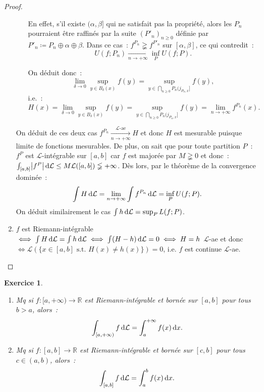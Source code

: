 \documentclass{article}
\newtheorem{ex}{Exercice}[section]
\newcommand{\pinfty}{{+\infty}}
\newcommand{\st}{\text{ s.t. }}
\newcommand{\R}{{\mathbb R}}
\begin{document}
\begin{proof}
\begin{enumerate}
\begin{itemize}
		En effet, s'il existe $(\alpha, \beta]$ qui ne satisfait pas la propriété, alors les $P_n$ pourraient être raffinés par la suite $(P'_n)_{n \geq 0}$ définie par
		$P'_n \coloneqq P_n \oplus \alpha \oplus \beta$. Dans ce cas~: $f^{P_n} \gneqq f^{P'_n}$ sur $[\alpha, \beta]$, ce qui contredit~:
		\[U(f; P_n) \xrightarrow[n \to \pinfty]{} \inf_PU(f; P).\]

		On déduit donc~:
		\[\lim_{\delta \to 0}\sup_{y \in B_\delta(x)}f(y) = \sup_{y \in \bigcap_{n \geq 0}P_n(j_{P_n,x}]}f(y),\]
		i.e.~:
		\[H(x) = \lim_{\delta \to 0}\sup_{y \in B_\delta(x)}f(y) = \sup_{y \in \bigcap_{n \geq 0}P_n(j_{P_n,x}]}f(y) = \lim_{n \to \pinfty}f^{P_n}(x).\]
	\end{itemize}
	On déduit de ces deux cas $f^{P_n} \xrightarrow[n \to \pinfty]{\mathcal L\text{-ae}} H$ et donc $H$ est mesurable puisque limite de fonctions mesurables. De plus, on sait
	que pour toute partition $P$~: $f^P$ est $\mathcal L$-intégrable sur $[a, b]$ car $f$ est majorée par $M \gneqq 0$ et donc~:
	$\int_{[a, b]} \abs {f^P}\dif\mathcal L \leq M\mathcal L([a, b]) \lneqq \pinfty$. Dès lors,
	par le théorème de la convergence dominée~:
	\[\int H\dif\mathcal L = \lim_{n \to \pinfty}\int f^{P_n}\dif\mathcal L = \inf_PU(f; P).\]
	On déduit similairement le cas $\int h\dif\mathcal L = \sup_PL(f; P)$.

	\item $f$ est Riemann-intégrable $\iff \int H\dif\mathcal L = \int h\dif\mathcal L \iff \int (H-h)\dif\mathcal L = 0 \iff H = h$ $\mathcal L$-ae
	et donc $\iff \mathcal L(\{x \in [a, b] \st H(x) \neq h(x)\}) = 0$, i.e. $f$ est continue $\mathcal L$-ae.
\end{enumerate}
\end{proof}

\begin{ex}~
\begin{enumerate}
	\item Mq si $f : [a, \pinfty) \to \R$ est Riemann-intégrable et bornée sur $[a, b]$ pour tous $b > a$, alors~:
	\[\int_{[a, \pinfty)}f\dif\mathcal L = \int_a^\pinfty f(x)\dif x.\]
	\item Mq si $f : [a, b] \to \R$ est Riemann-intégrable et bornée sur $[c, b]$ pour tous $c \in (a, b)$, alors~:
	\[\int_{[a, b]}f\dif\mathcal L = \int_a^bf(x)\dif x.\]
\end{enumerate}
\end{ex}
\end{document}
